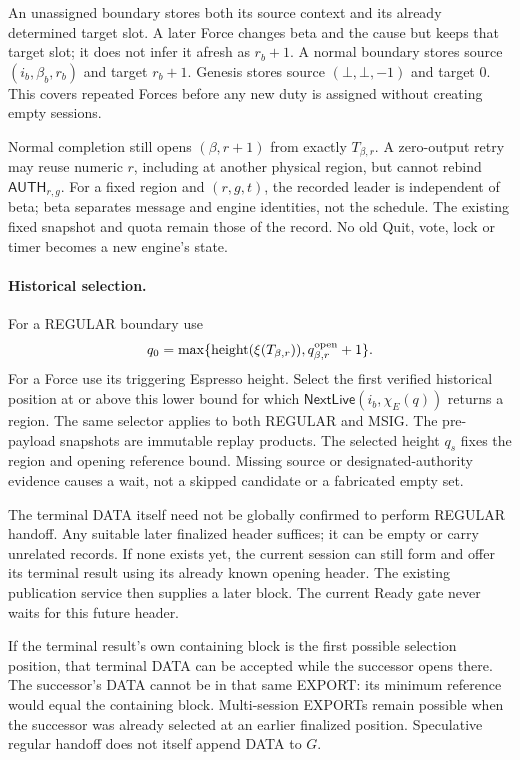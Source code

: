 \documentclass[11pt,a4paper]{article}
\newcommand{\tagg}[1]{\ensuremath{\mathsf{#1}}}
\begin{document}
An unassigned boundary stores both its source context and its already
determined target slot. A later Force changes beta and the cause but
keeps that target slot; it does not infer it afresh as $r_b+1$.
A normal boundary stores source $(i_b,\beta_b,r_b)$ and target $r_b+1$.
Genesis stores source $(\bot,\bot,-1)$ and target 0. This covers repeated
Forces before any new duty is assigned without creating empty sessions.

Normal completion still opens $(\beta,r+1)$ from exactly
$T_{\beta,r}$. A zero-output retry may reuse numeric $r$, including at
another physical region, but cannot rebind $\tagg{AUTH}_{r,g}$.
For a fixed region and $(r,g,t)$, the recorded leader is independent
of beta; beta separates message and engine identities, not the schedule.
The existing fixed snapshot and quota remain those of the record.
No old Quit, vote, lock or timer becomes a new engine's state.

\paragraph{Historical selection.}
For a REGULAR boundary use
\[
 q_0=\max\{\operatorname{height}(\xi(T_{\beta,r})),
                         q^{\rm open}_{\beta,r}+1\}.
\]
For a Force use its triggering Espresso height. Select the first
verified historical position at or above this lower bound for which
$\tagg{NextLive}(i_b,\chi_E(q))$ returns a region. The same
selector applies to both REGULAR and MSIG.
The pre-payload snapshots are immutable replay products. The selected
height $q_s$ fixes the region and opening reference bound. Missing
source or designated-authority evidence causes a wait, not a skipped
candidate or a fabricated empty set.

The terminal DATA itself need not be globally confirmed to perform
REGULAR handoff. Any suitable later finalized header suffices; it can
be empty or carry unrelated records. If none exists yet, the current
session can still form and offer its terminal result using its already
known opening header. The existing publication service then supplies
a later block. The current Ready gate never waits for this future header.

If the terminal result's own containing block is the first possible
selection position, that terminal DATA can be accepted while the
successor opens there. The successor's DATA cannot be in that same
EXPORT: its minimum reference would equal the containing block.
Multi-session EXPORTs remain possible when the successor was already
selected at an earlier finalized position. Speculative regular handoff
does not itself append DATA to $G$.
\end{document}
